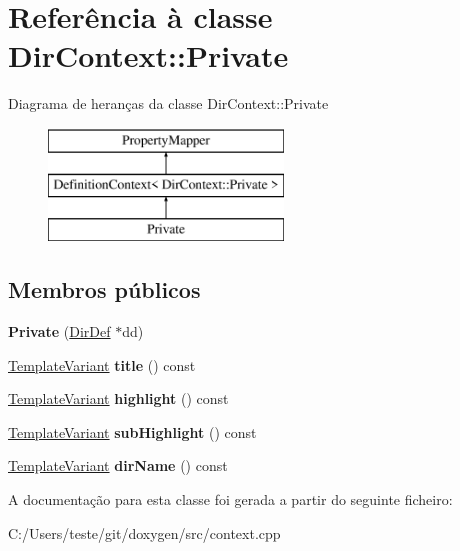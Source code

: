 \hypertarget{class_dir_context_1_1_private}{\section{Referência à classe Dir\-Context\-:\-:Private}
\label{class_dir_context_1_1_private}
}
Diagrama de heranças da classe Dir\-Context\-:\-:Private\begin{figure}[H]
\begin{center}
\leavevmode
\includegraphics[height=3.000000cm]{class_dir_context_1_1_private}
\end{center}
\end{figure}
\subsection*{Membros públicos}
\begin{DoxyCompactItemize}
\item 
\hypertarget{class_dir_context_1_1_private_acb569fc973b336fe0ac86d244e7c0cd4}{{\bfseries Private} (\hyperlink{class_dir_def}{Dir\-Def} $\ast$dd)}\label{class_dir_context_1_1_private_acb569fc973b336fe0ac86d244e7c0cd4}

\item 
\hypertarget{class_dir_context_1_1_private_a5732df72750a31555da8a10f5788ef02}{\hyperlink{class_template_variant}{Template\-Variant} {\bfseries title} () const }\label{class_dir_context_1_1_private_a5732df72750a31555da8a10f5788ef02}

\item 
\hypertarget{class_dir_context_1_1_private_ab088f4d955499ca1d67c286a117e5bfe}{\hyperlink{class_template_variant}{Template\-Variant} {\bfseries highlight} () const }\label{class_dir_context_1_1_private_ab088f4d955499ca1d67c286a117e5bfe}

\item 
\hypertarget{class_dir_context_1_1_private_a07fdcdf7a4c2a31c3ca0c5ffea8b6a9e}{\hyperlink{class_template_variant}{Template\-Variant} {\bfseries sub\-Highlight} () const }\label{class_dir_context_1_1_private_a07fdcdf7a4c2a31c3ca0c5ffea8b6a9e}

\item 
\hypertarget{class_dir_context_1_1_private_a175ce3df3de84ba6661345df8e41d1aa}{\hyperlink{class_template_variant}{Template\-Variant} {\bfseries dir\-Name} () const }\label{class_dir_context_1_1_private_a175ce3df3de84ba6661345df8e41d1aa}

\end{DoxyCompactItemize}


A documentação para esta classe foi gerada a partir do seguinte ficheiro\-:\begin{DoxyCompactItemize}
\item 
C\-:/\-Users/teste/git/doxygen/src/context.\-cpp\end{DoxyCompactItemize}
